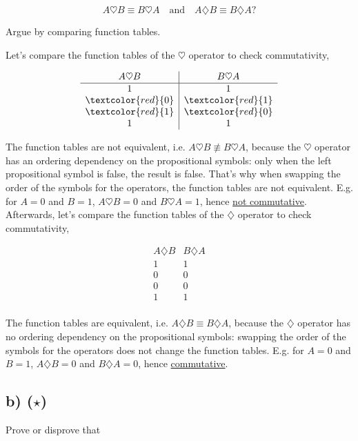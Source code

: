 \documentclass[unicode,11pt,a4paper,oneside,numbers=endperiod,openany]{scrartcl}
\begin{document}
\[
A \heartsuit B \equiv B \heartsuit A 
\quad \text{and} \quad 
A \diamondsuit B \equiv B \diamondsuit A ?
\]

\noindent Argue by comparing function tables.
\\\newline

Let's compare the function tables of the \( \heartsuit \) operator to check commutativity,

\[
\begin{array}{c|c}
A \heartsuit B & B \heartsuit A \\
\hline
1 & 1 \\
\textcolor{red}{0} & \textcolor{red}{1} \\
\textcolor{red}{1} & \textcolor{red}{0} \\
1 & 1 \\
\end{array}
\]

The function tables are not equivalent, i.e. \( A \heartsuit B \not\equiv B \heartsuit A \),
because the \( \heartsuit \) operator has an ordering dependency on the propositional symbols:
only when the left propositional symbol is false, the result is false.
That's why when swapping the order of the symbols for the operators, 
the function tables are not equivalent.
E.g. for \( A = 0 \) and \( B = 1 \), \( A \heartsuit B = 0 \) and \( B \heartsuit A = 1 \),
hence \underline{not commutative}.
\\

Afterwards, let's compare the function tables of the \( \diamondsuit \) operator 
to check commutativity,   

\[
\begin{array}{c|c}
A \diamondsuit B & B \diamondsuit A \\
\hline
1 & 1 \\
0 & 0 \\
0 & 0 \\
1 & 1 \\
\end{array}
\]

The function tables are equivalent, i.e. \( A \diamondsuit B \equiv B \diamondsuit A \),
because the \( \diamondsuit \) operator has no ordering dependency on the propositional symbols:
swapping the order of the symbols for the operators does not change the function tables.
E.g. for \( A = 0 \) and \( B = 1 \), \( A \diamondsuit B = 0 \) and \( B \diamondsuit A = 0 \),
hence \underline{commutative}.


\subsection*{b) (\(\star\))} 
Prove or disprove that
\end{document}
